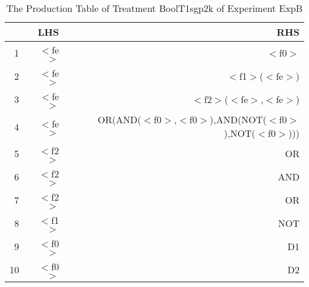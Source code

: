 \begin{table}[ht]
\centering
\begin{tabular}{rrr}
  \hline
 & LHS & RHS \\ 
  \hline
1 & $<$fe$>$ & $<$f0$>$ \\ 
  2 & $<$fe$>$ & $<$f1$>$($<$fe$>$) \\ 
  3 & $<$fe$>$ & $<$f2$>$($<$fe$>$,$<$fe$>$) \\ 
  4 & $<$fe$>$ & OR(AND($<$f0$>$,$<$f0$>$),AND(NOT($<$f0$>$),NOT($<$f0$>$))) \\ 
  5 & $<$f2$>$ & OR \\ 
  6 & $<$f2$>$ & AND \\ 
  7 & $<$f2$>$ & OR \\ 
  8 & $<$f1$>$ & NOT \\ 
  9 & $<$f0$>$ & D1 \\ 
  10 & $<$f0$>$ & D2 \\ 
   \hline
\end{tabular}
\caption{The Production Table of Treatment BoolT1sgp2k of Experiment ExpB} 
\end{table}
